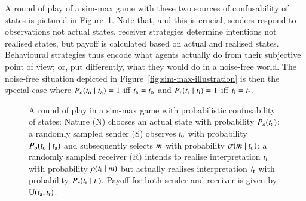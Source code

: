 \documentclass[12pt,english]{article}
\newcommand{\similarity}{\ensuremath{\mathrm{Sim}}} %
\numberwithin{equation}{section}
\begin{document}
\noindent A round of play of a sim-max game with these two sources of confusability of states
is pictured in Figure~\ref{fig:imprecise-sim-max-illustration}. Note that, and this is crucial,
senders respond to observations not actual states, receiver strategies determine intentions not
realised states, but payoff is calculated based on actual and realised states. Behavioural
strategies thus encode what agents actually do from their subjective point of view; or, put
differently, what they would do in a noise-free world. The noise-free situation depicted in
Figure~\ref{fig:sim-max-illustration} is then the special case where
$P_o(t_{\mathrm{o}} \mid t_{\mathrm{a}}) = 1$ iff $t_{\mathrm{a}} = t_{\mathrm{o}}$ and
$P_r(t_{\mathrm{r}} \mid t_{\mathrm{i}}) = 1$ iff $t_{\mathrm{i}} = t_{\mathrm{r}}$.

\begin{figure}
  \centering


  \caption{A round of play in a sim-max game with probabilistic confusability of states: Nature
    (N) chooses an actual state with probability $P_a(t_{\mathrm{a}})$; a randomly sampled sender
    (S) observes $t_{\mathrm{o}}$ with probability $P_o(t_{\mathrm{o}} \mid t_{\mathrm{a}})$ and
    subsequently selects $m$ with probability $\sigma(m \mid t_{\mathrm{o}})$; a
    randomly sampled receiver (R) intends to realise interpretation $t_{\mathrm{i}}$ with
    probability $\rho(t_{\mathrm{i}} \mid m)$ but actually realises interpretation
    $t_{\mathrm{r}}$ with probability $P_r(t_{\mathrm{r}} \mid t_{\mathrm{i}})$. Payoff for both
    sender and receiver is given by $\mathrm{U}(t_{\mathrm{a}}, t_{\mathrm{r}})$.}
  \label{fig:imprecise-sim-max-illustration}
\end{figure}
\end{document}
